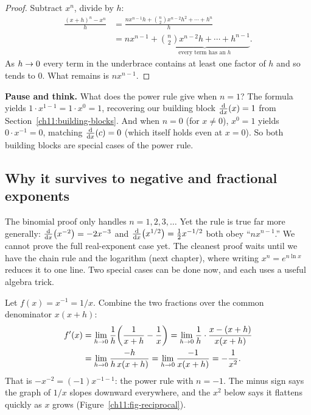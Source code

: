\begin{proof}
Subtract $x^n$, divide by $h$:
\begin{align*}
  \frac{(x+h)^n - x^n}{h}
  &= \frac{n x^{n-1}h + \binom{n}{2}x^{n-2}h^2 + \cdots + h^n}{h} \\
  &= n x^{n-1} + \underbrace{\binom{n}{2}x^{n-2}h + \cdots + h^{n-1}}_{\text{every term has an } h}.
\end{align*}
As $h\to 0$ every term in the underbrace contains at least one factor of $h$ and so tends
to $0$. What remains is $n x^{n-1}$.
\end{proof}

\begin{recoverybox}
\textbf{Pause and think.} What does the power rule give when $n=1$?
The formula yields $1\cdot x^{1-1} = 1\cdot x^0 = 1$, recovering our building block
$\frac{\mathrm{d}}{\mathrm{d} x}\!\left(x\right)=1$ from Section~\ref{ch11:building-blocks}. And when $n=0$ (for $x\ne 0$),
$x^0=1$ yields $0\cdot x^{-1} = 0$, matching $\frac{\mathrm{d}}{\mathrm{d} x}\!\left(c\right)=0$ (which itself holds even at
$x=0$). So both building blocks are special cases of the power rule.
\end{recoverybox}

\subsection{Why it survives to negative and fractional exponents}

The binomial proof only handles $n=1,2,3,\dots$ Yet the rule is true far more generally:
$\frac{\mathrm{d}}{\mathrm{d} x}\!\left(x^{-2}\right) = -2x^{-3}$ and $\frac{\mathrm{d}}{\mathrm{d} x}\!\left(x^{1/2}\right) = \tfrac12 x^{-1/2}$ both obey
``$n x^{n-1}$.'' We cannot prove the full real-exponent case yet. The
cleanest proof waits until we have the chain rule and the logarithm (next chapter), where
writing $x^n = e^{n\ln x}$ reduces it to one line. Two special cases can be done now,
and each uses a useful algebra trick.

\begin{example}\label{ch11:ex-reciprocal}
Let $f(x)=x^{-1}=1/x$. Combine the two fractions over the common denominator $x(x+h)$:
\begin{align*}
  f'(x) &= \lim_{h\to 0}\frac{1}{h}\!\left(\frac{1}{x+h}-\frac{1}{x}\right)
         = \lim_{h\to 0}\frac{1}{h}\cdot\frac{x-(x+h)}{x(x+h)} \\
        &= \lim_{h\to 0}\frac{-h}{h\,x(x+h)}
         = \lim_{h\to 0}\frac{-1}{x(x+h)}
         = -\frac{1}{x^2}.
\end{align*}
That is $-x^{-2} = (-1)x^{-1-1}$: the power rule with $n=-1$. The minus sign says the
graph of $1/x$ slopes downward everywhere, and the $x^2$ below says it flattens quickly
as $x$ grows (Figure~\ref{ch11:fig-reciprocal}).
\end{example}

